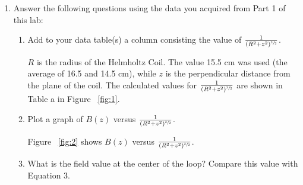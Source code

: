 \documentclass [12pt, letterpaper, twoside] {article}
\begin{document}
\begin{enumerate}
  \item{Answer the following questions using the data you acquired from Part 1 of this lab:}
    \begin{enumerate}
      \item{Add to your data table(s) a column consisting the value of \(\frac{1}{(R^{2}+z^{2})^{\sfrac{3}{2}}}\).}

        \(R\) is the radius of the Helmholtz Coil. The value 15.5 cm was used (the average of 16.5 and 14.5 cm), while \(z\) is the perpendicular distance from the plane of the coil. The calculated values for \(\frac{1}{(R^{2}+z^{2})^{\sfrac{3}{2}}}\) are shown in Table a in Figure ~\ref{fig:1}.

      \item{Plot a graph of \(B(z)\) versus \(\frac{1}{(R^{2}+z^{2})^{\sfrac{3}{2}}}\).}

        Figure ~\ref{fig:2} shows \(B(z)\) versus \(\frac{1}{(R^{2}+z^{2})^{\sfrac{3}{2}}}\).

      \item{What is the field value at the center of the loop?  Compare this value with Equation 3.}


\end{enumerate}
\end{enumerate}
\end{document}
